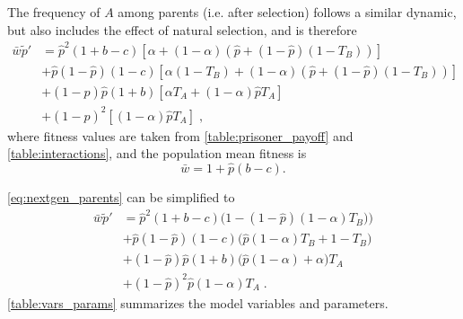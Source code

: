 \documentclass[12pt]{extarticle}
\begin{document}
The frequency of $A$ among parents (i.e. after selection) follows a similar dynamic, but also includes the effect of natural selection, and is therefore
\begin{equation}\label{eq:nextgen_parents}
\begin{aligned}
\bar{w} \tilde{p}'
& = \hat{p}^2 (1+b-c) [\alpha + (1-\alpha)(\hat{p} + (1-\hat{p})(1-T_B))] \\
& + \hat{p}(1-\hat{p}) (1-c) [\alpha(1-T_B) + (1-\alpha)(\hat{p} + (1-\hat{p})(1-T_B))] \\
& + (1-\hat{p})\hat{p} (1+b) [\alpha T_A + (1-\alpha) \hat{p} T_A ] \\
& + (1-\hat{p})^2 [(1-\alpha) \hat{p} T_A] \;,
\end{aligned}
\end{equation}
where fitness values are taken from \autoref{table:prisoner_payoff} and \autoref{table:interactions}, and the population mean fitness is
\begin{equation} \label{eq:mean_fitness}
\bar{w} =  1 + \hat{p}(b-c).
\end{equation}

\autoref{eq:nextgen_parents} can be simplified to
\begin{equation}\label{eq:nextgen_parents_simplified}
\begin{aligned}
\bar{w} \tilde{p}'
& = \hat{p}^2 (1+b-c) \big(1-(1-\hat{p})(1-\alpha)T_B)\big) \\
& + \hat{p}(1-\hat{p}) (1-c) \big(\hat{p}(1-\alpha)T_B+1-T_B\big) \\
& + (1-\hat{p})\hat{p} (1+b) \big(\hat{p}(1-\alpha) + \alpha\big) T_A \\
& + (1-\hat{p})^2 \hat{p} (1-\alpha) T_A \;.
\end{aligned}
\end{equation}
\autoref{table:vars_params} summarizes the model variables and parameters.
\end{document}
